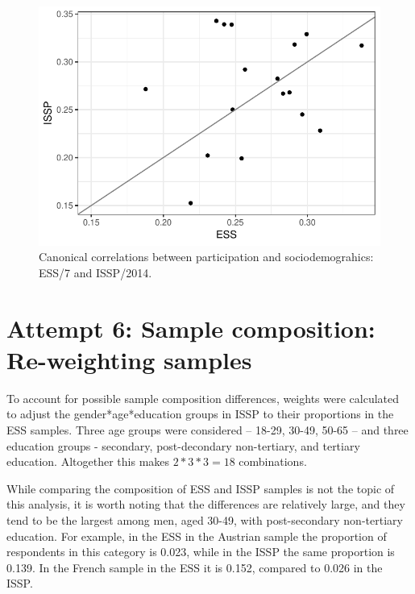 \documentclass[12pt,]{article}
\begin{document}
\begin{figure}[H]

{\centering \includegraphics{report_files/figure-latex/can-cor-1} 

}

\caption{Canonical correlations between participation and sociodemograhics: ESS/7 and ISSP/2014.}\label{fig:can-cor}
\end{figure}

\hypertarget{attempt-6-sample-composition-re-weighting-samples}{%
\section{Attempt 6: Sample composition: Re-weighting samples}\label{attempt-6-sample-composition-re-weighting-samples}}

To account for possible sample composition differences, weights were calculated to adjust the gender*age*education groups in ISSP to their proportions in the ESS samples. Three age groups were considered -- 18-29, 30-49, 50-65 -- and three education groups - secondary, post-decondary non-tertiary, and tertiary education. Altogether this makes \(2*3*3=18\) combinations.

While comparing the composition of ESS and ISSP samples is not the topic of this analysis, it is worth noting that the differences are relatively large, and they tend to be the largest among men, aged 30-49, with post-secondary non-tertiary education. For example, in the ESS in the Austrian sample the proportion of respondents in this category is 0.023, while in the ISSP the same proportion is 0.139. In the French sample in the ESS it is 0.152, compared to 0.026 in the ISSP.
\end{document}
